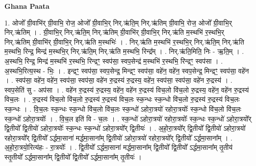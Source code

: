 \documentclass[17pt]{extarticle}
\begin{document}
\textbf{Ghana Paata } \newline

1. ओजो᳚ ग्री॒वाभि॑र् ग्री॒वाभि॒ रोज॒ ओजो᳚ ग्री॒वाभि॒र् निर्.ऋ॑ति॒म् निर्.ऋ॑तिम् ग्री॒वाभि॒ रोज॒ ओजो᳚ ग्री॒वाभि॒र् निर्.ऋ॑तिम् । . ग्री॒वाभि॒र् निर्.ऋ॑ति॒म् निर्.ऋ॑तिम् ग्री॒वाभि॑र् ग्री॒वाभि॒र् निर्.ऋ॑ति म॒स्थभि॑ र॒स्थभि॒र् निर्.ऋ॑तिम् ग्री॒वाभि॑र् ग्री॒वाभि॒र् निर्.ऋ॑ति म॒स्थभिः॑ । . निर्.ऋ॑ति म॒स्थभि॑ र॒स्थभि॒र् निर्.ऋ॑ति॒म् निर्.ऋ॑ति म॒स्थभि॒ रिन्द्र॒ मिन्द्र॑ म॒स्थभि॒र् निर्.ऋ॑ति॒म् निर्.ऋ॑ति म॒स्थभि॒ रिन्द्र᳚म् । . निर्.ऋ॑ति॒मिति॒ निः - ऋ॒ति॒म् । . अ॒स्थभि॒ रिन्द्र॒ मिन्द्र॑ म॒स्थभि॑ र॒स्थभि॒ रिन्द्रꣳ॒॒ स्वप॑सा॒ स्वप॒सेन्द्र॑ म॒स्थभि॑ र॒स्थभि॒ रिन्द्रꣳ॒॒ स्वप॑सा । . अ॒स्थभि॒रित्य॒स्थ - भिः॒ । . इन्द्रꣳ॒॒ स्वप॑सा॒ स्वप॒सेन्द्र॒ मिन्द्रꣳ॒॒ स्वप॑सा॒ वहे॑न॒ वहे॑न॒ स्वप॒सेन्द्र॒ मिन्द्रꣳ॒॒ स्वप॑सा॒ वहे॑न । . स्वप॑सा॒ वहे॑न॒ वहे॑न॒ स्वप॑सा॒ स्वप॑सा॒ वहे॑न रु॒द्रस्य॑ रु॒द्रस्य॒ वहे॑न॒ स्वप॑सा॒ स्वप॑सा॒ वहे॑न रु॒द्रस्य॑ । . स्वप॒सेति॑ सु - अप॑सा । . वहे॑न रु॒द्रस्य॑ रु॒द्रस्य॒ वहे॑न॒ वहे॑न रु॒द्रस्य॑ विच॒लो वि॑च॒लो रु॒द्रस्य॒ वहे॑न॒ वहे॑न रु॒द्रस्य॑ विच॒लः । . रु॒द्रस्य॑ विच॒लो वि॑च॒लो रु॒द्रस्य॑ रु॒द्रस्य॑ विच॒लः स्क॒न्धः स्क॒न्धो वि॑च॒लो रु॒द्रस्य॑ रु॒द्रस्य॑ विच॒लः स्क॒न्धः । . वि॒च॒लः स्क॒न्धः स्क॒न्धो वि॑च॒लो वि॑च॒लः स्क॒न्धो॑ ऽहोरा॒त्रयो॑ रहोरा॒त्रयोः᳚ स्क॒न्धो वि॑च॒लो वि॑च॒लः स्क॒न्धो॑ ऽहोरा॒त्रयोः᳚ । . वि॒च॒ल इति॑ वि - च॒लः । . स्क॒न्धो॑ ऽहोरा॒त्रयो॑ रहोरा॒त्रयोः᳚ स्क॒न्धः स्क॒न्धो॑ ऽहोरा॒त्रयो᳚र् द्वि॒तीयो᳚ द्वि॒तीयो॑ ऽहोरा॒त्रयोः᳚ स्क॒न्धः स्क॒न्धो॑ ऽहोरा॒त्रयो᳚र् द्वि॒तीयः॑ । . अ॒हो॒रा॒त्रयो᳚र् द्वि॒तीयो᳚ द्वि॒तीयो॑ ऽहोरा॒त्रयो॑ रहोरा॒त्रयो᳚र् द्वि॒तीयो᳚ ऽर्द्धमा॒साना॑ मर्द्धमा॒साना᳚म् द्वि॒तीयो॑ ऽहोरा॒त्रयो॑ रहोरा॒त्रयो᳚र् द्वि॒तीयो᳚ ऽर्द्धमा॒साना᳚म् । . अ॒हो॒रा॒त्रयो॒रित्य॑हः - रा॒त्रयोः᳚ । . द्वि॒तीयो᳚ ऽर्द्धमा॒साना॑ मर्द्धमा॒साना᳚म् द्वि॒तीयो᳚ द्वि॒तीयो᳚ ऽर्द्धमा॒साना᳚म् तृ॒तीय॑ स्तृ॒तीयो᳚ ऽर्द्धमा॒साना᳚म् द्वि॒तीयो᳚ द्वि॒तीयो᳚ ऽर्द्धमा॒साना᳚म् तृ॒तीयः॑ । \newline
\end{document}
